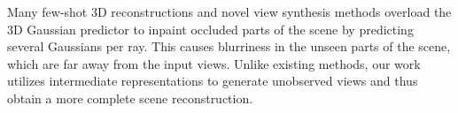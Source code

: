 Many few-shot 3D reconstructions and novel view synthesis methods overload the 3D Gaussian predictor to inpaint occluded parts of the scene by predicting several Gaussians per ray. This causes blurriness in the unseen parts of the scene, which are far away from the input views. Unlike existing methods, our work utilizes intermediate representations to generate unobserved views and thus obtain a more complete scene reconstruction.